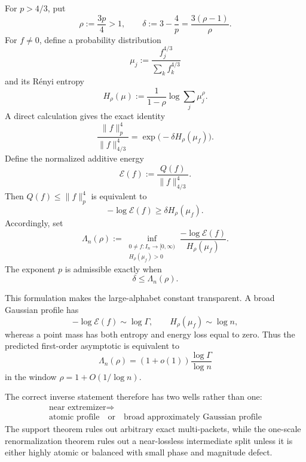 \documentclass[11pt,reqno]{amsart}
\numberwithin{equation}{section}
\theoremstyle{definition}
\theoremstyle{remark}
\newcommand{\norm}[1]{\lVert #1\rVert}
\begin{document}
For $p>4/3$, put
\begin{equation}\label{eq:rho-delta}
  \rho:=\frac{3p}{4}>1,
  \qquad
  \delta:=3-\frac4p=\frac{3(\rho-1)}{\rho}.
\end{equation}
For $f\ne0$, define a probability distribution
\begin{equation}\label{eq:mu-f}
  \mu_j:=\frac{f_j^{4/3}}{\sum_kf_k^{4/3}}
\end{equation}
and its R\'enyi entropy
\begin{equation}\label{eq:Renyi}
  H_\rho(\mu):=\frac1{1-\rho}\log\sum_j\mu_j^\rho.
\end{equation}
A direct calculation gives the exact identity
\begin{equation}\label{eq:entropy-norm}
  \boxed{
  \frac{\norm f_p^4}{\norm f_{4/3}^4}
  =\exp\bigl(-\delta H_\rho(\mu_f)\bigr).}
\end{equation}
Define the normalized additive energy
\begin{equation}\label{eq:normalized-energy}
  \mathscr E(f):=\frac{Q(f)}{\norm f_{4/3}^4}.
\end{equation}
Then $Q(f)\le\norm f_p^4$ is equivalent to
\begin{equation}\label{eq:entropy-energy}
  -\log\mathscr E(f)\ge\delta H_\rho(\mu_f).
\end{equation}
Accordingly, set
\begin{equation}\label{eq:Lambda}
  \Lambda_n(\rho):=
  \inf_{\substack{0\ne f\colon I_n\to[0,\infty)\\H_\rho(\mu_f)>0}}
  \frac{-\log\mathscr E(f)}{H_\rho(\mu_f)}.
\end{equation}
The exponent $p$ is admissible exactly when
\begin{equation}\label{eq:Lambda-admissible}
  \delta\le\Lambda_n(\rho).
\end{equation}

This formulation makes the large-alphabet constant transparent.  A broad
Gaussian profile has
\[
  -\log\mathscr E(f)\sim\log\Gamma,
  \qquad
  H_\rho(\mu_f)\sim\log n,
\]
whereas a point mass has both entropy and energy loss equal to zero.  Thus
the predicted first-order asymptotic is equivalent to
\begin{equation}\label{eq:Lambda-target}
  \Lambda_n(\rho)
  =(1+o(1))\frac{\log\Gamma}{\log n}
\end{equation}
in the window $\rho=1+O(1/\log n)$.

The correct inverse statement therefore has two wells rather than one:
\begin{equation}\label{eq:two-well}
  \boxed{
  \begin{gathered}
  \text{near extremizer}\Longrightarrow\\
  \text{atomic profile}
  \quad\text{or}\quad
  \text{broad approximately Gaussian profile}
  \end{gathered}}
\end{equation}
The support theorem rules out arbitrary exact multi-packets, while the
one-scale renormalization theorem rules out a near-lossless intermediate
split unless it is either highly atomic or balanced with small phase and
magnitude defect.
\end{document}
